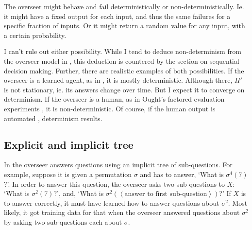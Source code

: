 \documentclass{farlamp}
\begin{document}
The overseer might behave and fail deterministically or non-deterministically.
Ie. it might have a fixed output for each input, and thus the same failures for
a specific fraction of inputs. Or it might return a random value for any input,
with a certain probability.

I can't rule out either possibility. While I tend to deduce non-determinism from
the overseer model in \textcite{ChriRelAmp}, this deduction is countered by the
section on sequential decision making. Further, there are realistic examples of
both possibilities. If the overseer is a learned agent, as in
\textcite{CSASupAmp}, it is mostly deterministic. Although there, $H'$ is not
stationary, ie. its answers change over time. But I expect it to converge on
determinism. If the overseer is a human, as in Ought's factored evaluation
experiments \parencite{StuhDelCog}, it is non-deterministic. Of course, if the
human output is automated \parencite[see][sec. ‘Caching’ f.]{StuhTaxCapAmp},
determinism results.

%
%
%
%


\subsection{Explicit and implicit tree}

In \textcite{CSASupAmp} the overseer answers questions using an implicit tree of
sub-questions. For example, suppose it is given a permutation $\sigma$ and has
to answer, ‘What is $\sigma^4(7)$?’. In order to answer this question, the
overseer asks two sub-questions to $X$: ‘What is $\sigma^2(7)$?’, and, ‘What is
$\sigma^2(\left<\text{answer to first sub-question}\right>)$?’
If $X$ is to answer correctly, it must have learned how to answer questions
about $\sigma^2$. Most likely, it got training data for that when the overseer
answered questions about $\sigma^2$ by asking two sub-questions each about
$\sigma$.
\end{document}

